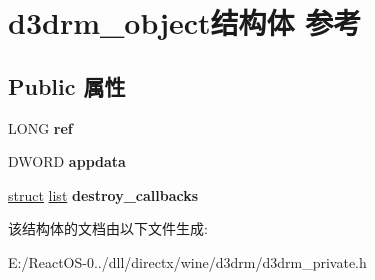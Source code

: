 \hypertarget{structd3drm__object}{}\section{d3drm\+\_\+object结构体 参考}
\label{structd3drm__object}
\subsection*{Public 属性}
\begin{DoxyCompactItemize}
\item 
\mbox{\label{structd3drm__object_ad9e78ca362769422437b578604485407}} 
L\+O\+NG {\bfseries ref}
\item 
\mbox{\label{structd3drm__object_a6ff77f189e4bb464121890f1aa62908c}} 
D\+W\+O\+RD {\bfseries appdata}
\item 
\mbox{\label{structd3drm__object_a263525dc3ab1e80e56a46ae0719f0edb}} 
\hyperlink{interfacestruct}{struct} \hyperlink{classlist}{list} {\bfseries destroy\+\_\+callbacks}
\end{DoxyCompactItemize}


该结构体的文档由以下文件生成\+:\begin{DoxyCompactItemize}
\item 
E\+:/\+React\+O\+S-\/0../dll/directx/wine/d3drm/d3drm\+\_\+private.\+h\end{DoxyCompactItemize}
